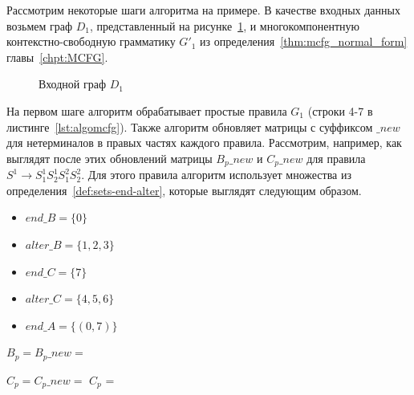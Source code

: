 Рассмотрим некоторые шаги алгоритма на примере. В качестве входных данных возьмем граф $D_1$, представленный на рисунке~\ref{fig:example_input_graph_mcfg}, и многокомпонентную контекстно-свободную грамматику $G'_1$ из определения~\ref{thm:mcfg_normal_form} главы~\ref{chpt:MCFG}.

\begin{figure}[h]
	\centering
	\resizebox{\columnwidth}{!}{
	
	}
	\caption{Входной граф $D_1$}
	\label{fig:example_input_graph_mcfg}
\end{figure}

На первом шаге алгоритм обрабатывает простые правила $G_1$ (строки 4-7 в листинге~\ref{lst:algomcfg}). Также алгоритм обновляет матрицы с суффиксом $\_new$ для нетерминалов в правых частях каждого правила. Рассмотрим, например, как выглядят после этих обновлений матрицы $B_p\_new$ и $C_p\_new$ для правила $S^1 \rightarrow S_1^1 S_2^1 S_1^2 S_2^2$. Для этого правила алгоритм использует множества из определения~\ref{def:sets-end-alter}, которые выглядят следующим образом.

\begin{center}
	\begin{itemize}
		\item $end\_B = \{0\}$
		\item $alter\_B = \{1,2,3\}$
		\item $end\_C = \{7\}$
		\item $alter\_C = \{4,5,6\}$
		\item $end\_A = \{(0, 7)\}$
	\end{itemize}
\end{center}

\begin{center}
	$B_p = B_p\_new = $ {\footnotesize
	}
\end{center}


\begin{center}
	$C_p = C_p\_new = $ $C_p$ = 
\end{center}




